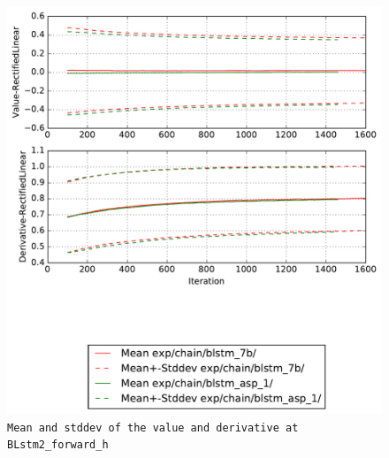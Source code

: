\documentclass[prl,10pt,twocolumn]{revtex4}
\begin{document}
\newpage
\begin{figure}[h]
  \begin{center}
    \caption{\texttt{Mean and stddev of the value and derivative at BLstm2\_forward\_h}}
    \includegraphics[width=\textwidth]{exp/chain/blstm_7b/report/nonlinstats_BLstm2_forward_h.pdf}
  \end{center}
\end{figure}
\clearpage
\end{document}
